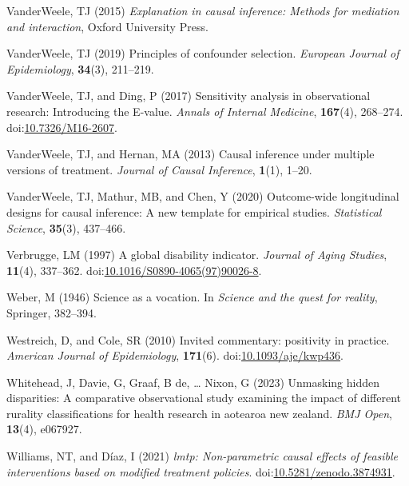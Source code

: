 \documentclass[
  single column]{article}
\newlength{\cslhangindent}
\newenvironment{CSLReferences}[2] %
 {\begin{list}{}{%
  \setlength{\itemindent}{0pt}
  \setlength{\leftmargin}{0pt}
  \setlength{\parsep}{0pt}
  \ifodd #1
   \setlength{\leftmargin}{\cslhangindent}
   \setlength{\itemindent}{-1\cslhangindent}
  \fi
  \setlength{\itemsep}{#2\baselineskip}}}
 {\end{list}}
\begin{document}
\begin{CSLReferences}{1}{0}
VanderWeele, TJ (2015) \emph{Explanation in causal inference: Methods
for mediation and interaction}, Oxford University Press.

VanderWeele, TJ (2019) Principles of confounder selection.
\emph{European Journal of Epidemiology}, \textbf{34}(3), 211--219.

VanderWeele, TJ, and Ding, P (2017) Sensitivity analysis in
observational research: Introducing the {E}-value. \emph{Annals of
Internal Medicine}, \textbf{167}(4), 268--274.
doi:\href{https://doi.org/10.7326/M16-2607}{10.7326/M16-2607}.

VanderWeele, TJ, and Hernan, MA (2013) Causal inference under multiple
versions of treatment. \emph{Journal of Causal Inference},
\textbf{1}(1), 1--20.

VanderWeele, TJ, Mathur, MB, and Chen, Y (2020) Outcome-wide
longitudinal designs for causal inference: A new template for empirical
studies. \emph{Statistical Science}, \textbf{35}(3), 437--466.

Verbrugge, LM (1997) A global disability indicator. \emph{Journal of
Aging Studies}, \textbf{11}(4), 337--362.
doi:\href{https://doi.org/10.1016/S0890-4065(97)90026-8}{10.1016/S0890-4065(97)90026-8}.

Weber, M (1946) Science as a vocation. In \emph{Science and the quest
for reality}, Springer, 382--394.

Westreich, D, and Cole, SR (2010) Invited commentary: positivity in
practice. \emph{American Journal of Epidemiology}, \textbf{171}(6).
doi:\href{https://doi.org/10.1093/aje/kwp436}{10.1093/aje/kwp436}.

Whitehead, J, Davie, G, Graaf, B de, \ldots{} Nixon, G (2023) Unmasking
hidden disparities: A comparative observational study examining the
impact of different rurality classifications for health research in
aotearoa new zealand. \emph{BMJ Open}, \textbf{13}(4), e067927.

Williams, NT, and Díaz, I (2021) \emph{{l}mtp: Non-parametric causal
effects of feasible interventions based on modified treatment policies}.
doi:\href{https://doi.org/10.5281/zenodo.3874931}{10.5281/zenodo.3874931}.


\end{CSLReferences}
\end{document}
